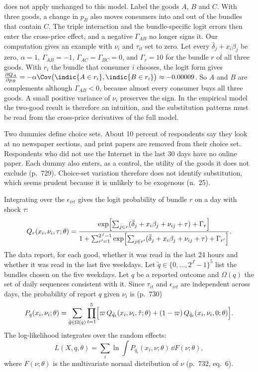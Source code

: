  does not apply unchanged to this model. Label the goods $A$, $B$ and $C$. With three
goods, a change in $p_B$ also moves consumers into and out of the bundles that contain $C$. The triple interaction
and the bundle-specific logit errors then enter the cross-price effect, and a negative $\Gamma_{AB}$ no longer
signs it. Our computation gives an example with $\nu_i$ and $\tau_{it}$ set to zero. Let every
$\bar\delta_j + x_i\beta_j$ be zero, $\alpha = 1$, $\Gamma_{AB} = -1$, $\Gamma_{AC} = \Gamma_{BC} = 0$, and
$\Gamma_r = 10$ for the bundle $r$ of all three goods. With $r_i$ the bundle that consumer $i$ chooses, the logit form
gives $\frac{\partial Q_A}{\partial p_B} = -\alpha\Cov\bigl(\indic\{A\in r_i\},\indic\{B\in r_i\}\bigr) \approx -0.00009$.
So $A$ and $B$ are complements although $\Gamma_{AB} < 0$, because almost every consumer buys all three goods. A
small positive variance of $\nu_i$ preserves the sign. In the empirical model the two-good result is therefore an
intuition, and the substitution patterns must be read from the cross-price derivatives of the full model.

Two dummies define choice sets. About 10 percent of respondents say they look at no newspaper sections, and print
papers are removed from their choice set. Respondents who did not use the Internet in the last 30 days have no online
paper. Each dummy also enters, as a control, the utility of the goods it does not exclude (p.~729). Choice-set
variation therefore does not identify substitution, which seems prudent because it is unlikely to be exogenous
(n.~25).

 Integrating over the $\epsilon_{irt}$ gives the logit probability of
bundle $r$ on a day with shock $\tau$:
\begin{equation}\label{eq:10-gentzkow-Q}
  Q_r(x_i, \nu_i, \tau; \theta) = \frac{\exp\Bigl[\sum_{j\in r}(\bar\delta_j + x_i\beta_j + \nu_{ij} + \tau) + \Gamma_r\Bigr]}
  {1 + \sum_{r'=1}^{2^J - 1}\exp\Bigl[\sum_{j\in r'}(\bar\delta_j + x_i\beta_j + \nu_{ij} + \tau) + \Gamma_{r'}\Bigr]} .
\end{equation}
The data report, for each good, whether it was read in the last 24 hours and whether it was read in the last five
weekdays. Let $\tilde q \in \{0, \dots, 2^J - 1\}^5$ list the bundles chosen on the five weekdays. Let $q$ be a reported
outcome and $\Omega(q)$ the set of daily sequences consistent with it. Since $\tau_{it}$ and $\epsilon_{irt}$ are
independent across days, the probability of report $q$ given $\nu_i$ is (p.~730)
\begin{equation}\label{eq:10-gentzkow-Pq}
  P_q(x_i, \nu_i; \theta) = \sum_{\tilde q \in \Omega(q)}\prod_{t=1}^{5}\Bigl[\varpi\,Q_{\tilde q_t}(x_i, \nu_i, \hat\tau;
  \theta) + (1 - \varpi)\,Q_{\tilde q_t}(x_i, \nu_i, 0; \theta)\Bigr] .
\end{equation}
The log-likelihood integrates over the random effects:
\begin{equation}\label{eq:10-gentzkow-loglik}
  L(X, q, \theta) = \sum_i \ln\int P_{q_i}(x_i, \nu; \theta)\,\dd F(\nu; \theta),
\end{equation}
where $F(\nu; \theta)$ is the multivariate normal distribution of $\nu$ (p.~732, eq.~6).

